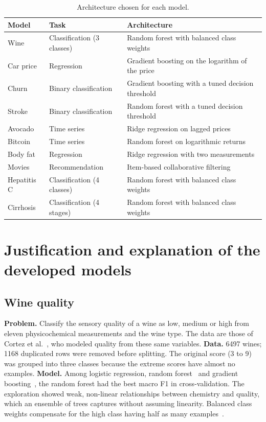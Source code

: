 \documentclass[11pt,letterpaper]{article}
\begin{document}
\begin{table}[H]
\centering
\caption{Architecture chosen for each model.}
\label{tab:architectures}
\begin{tabularx}{\textwidth}{llX}
\toprule
Model & Task & Architecture \\
\midrule
Wine & Classification (3 classes) & Random forest with balanced class weights \\
Car price & Regression & Gradient boosting on the logarithm of the price \\
Churn & Binary classification & Gradient boosting with a tuned decision threshold \\
Stroke & Binary classification & Random forest with a tuned decision threshold \\
Avocado & Time series & Ridge regression on lagged prices \\
Bitcoin & Time series & Random forest on logarithmic returns \\
Body fat & Regression & Ridge regression with two measurements \\
Movies & Recommendation & Item-based collaborative filtering \\
Hepatitis C & Classification (4 classes) & Random forest with balanced class weights \\
Cirrhosis & Classification (4 stages) & Random forest with balanced class weights \\
\bottomrule
\end{tabularx}
\end{table}

\section{Justification and explanation of the developed models}

\subsection{Wine quality}

\textbf{Problem.} Classify the sensory quality of a wine as low, medium or high from eleven physicochemical measurements and the wine type. The data are those of Cortez et al.~\cite{cortez2009}, who modeled quality from these same variables. \textbf{Data.} 6497 wines; 1168 duplicated rows were removed before splitting. The original score (3 to 9) was grouped into three classes because the extreme scores have almost no examples. \textbf{Model.} Among logistic regression, random forest~\cite{breiman2001} and gradient boosting~\cite{friedman2001}, the random forest had the best macro F1 in cross-validation. The exploration showed weak, non-linear relationships between chemistry and quality, which an ensemble of trees captures without assuming linearity. Balanced class weights compensate for the high class having half as many examples~\cite{he2009}.
\end{document}
